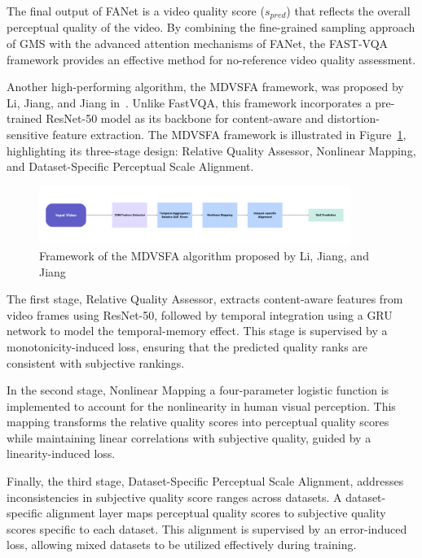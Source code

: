 The final output of FANet is a video quality score ($s_{pred}$) that reflects the overall perceptual quality of the video. By combining the fine-grained sampling approach of GMS with the advanced attention mechanisms of FANet, the FAST-VQA framework provides an effective method for no-reference video quality assessment.

Another high-performing algorithm, the MDVSFA framework, was proposed by Li, Jiang, and Jiang in~\cite{li2023unified}. Unlike FastVQA, this framework incorporates a pre-trained ResNet-50 model as its backbone for content-aware and distortion-sensitive feature extraction. The MDVSFA framework is illustrated in Figure~\ref{fig:framework2}, highlighting its three-stage design: Relative Quality Assessor, Nonlinear Mapping, and Dataset-Specific Perceptual Scale Alignment.

\begin{figure}
\centering
\includegraphics[width=0.9\textwidth]{figures/MDVSFA_framework.png}
\caption{Framework of the MDVSFA algorithm proposed by Li, Jiang, and Jiang~\cite{li2023unified}}
\label{fig:framework2}
\end{figure}

The first stage, Relative Quality Assessor, extracts content-aware features from video frames using ResNet-50, followed by temporal integration using a GRU network to model the temporal-memory effect. This stage is supervised by a monotonicity-induced loss, ensuring that the predicted quality ranks are consistent with subjective rankings.

In the second stage, Nonlinear Mapping a four-parameter logistic function is implemented to account for the nonlinearity in human visual perception. This mapping transforms the relative quality scores into perceptual quality scores while maintaining linear correlations with subjective quality, guided by a linearity-induced loss.

Finally, the third stage, Dataset-Specific Perceptual Scale Alignment, addresses inconsistencies in subjective quality score ranges across datasets. A dataset-specific alignment layer maps perceptual quality scores to subjective quality scores specific to each dataset. This alignment is supervised by an error-induced loss, allowing mixed datasets to be utilized effectively during training.

